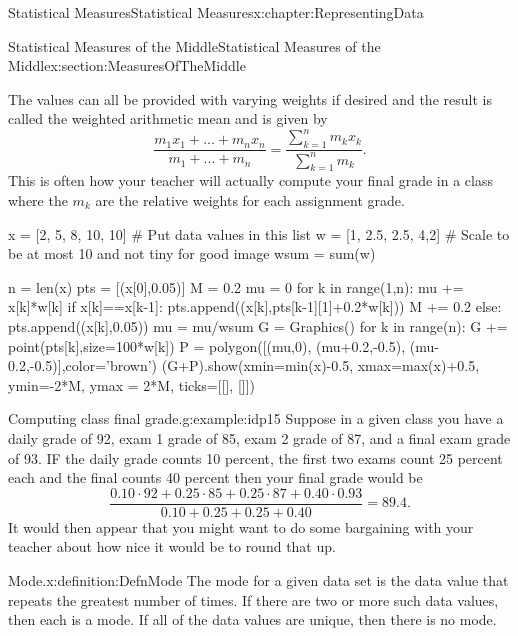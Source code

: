 \documentclass[oneside,10pt,]{book}
\numberwithin{equation}{section}
\begin{document}
\begin{chapterptx}{Statistical Measures}{}{Statistical Measures}{}{}{x:chapter:RepresentingData}
\begin{sectionptx}{Statistical Measures of the Middle}{}{Statistical Measures of the Middle}{}{}{x:section:MeasuresOfTheMiddle}
%
\par
The values can all be provided with varying weights if desired and the result is called the weighted arithmetic mean and is given by%
\begin{equation*}
\frac{m_1 x_1 + ... + m_n x_n}{m_1 + ... + m_n} = \frac{\sum_{k=1}^n m_k x_k}{\sum_{k=1}^n m_k}.
\end{equation*}
This is often how your teacher will actually compute your final grade in a class where the \(m_k\) are the relative weights for each assignment grade.%
\par
\leavevmode%
\begin{sageinput}
x = [2, 5, 8, 10, 10]     # Put data values in this list
w = [1, 2.5, 2.5, 4,2]  # Scale to be at most 10 and not tiny for good image
wsum = sum(w)

n = len(x)
pts = [(x[0],0.05)]
M = 0.2
mu = 0
for k in range(1,n):
    mu += x[k]*w[k]
    if x[k]==x[k-1]:
        pts.append((x[k],pts[k-1][1]+0.2*w[k]))
        M += 0.2
    else:
        pts.append((x[k],0.05))
mu = mu/wsum
G = Graphics()
for k in range(n):
    G += point(pts[k],size=100*w[k]) 
P = polygon([(mu,0), (mu+0.2,-0.5), (mu-0.2,-0.5)],color='brown')
(G+P).show(xmin=min(x)-0.5, xmax=max(x)+0.5, ymin=-2*M, ymax = 2*M, ticks=[[], []])
\end{sageinput}
%
\par
\begin{example}{Computing class final grade.}{g:example:idp15}%
Suppose in a given class you have a daily grade of 92, exam 1 grade of 85, exam 2 grade of 87, and a final exam grade of 93.  IF the daily grade counts 10 percent, the first two exams count 25 percent each and the final counts 40 percent then your final grade would be%
\begin{equation*}
\frac{0.10 \cdot 92 + 0.25 \cdot 85 + 0.25 \cdot 87 + 0.40 \cdot 0.93}{0.10 + 0.25 + 0.25 + 0.40} = 89.4 .
\end{equation*}
It would then appear that you might want to do some bargaining with your teacher about how nice it would be to round that up.%
\end{example}
%
\par
\begin{definition}{Mode.}{x:definition:DefnMode}%
The mode for a given data set is the data value that repeats the greatest number of times. If there are two or more such data values, then each is a mode. If all of the data values are unique, then there is no mode.%
\end{definition}
%
\par

\end{sectionptx}
\end{chapterptx}
\end{document}
